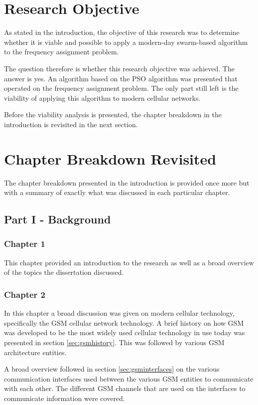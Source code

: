 \section{Research Objective}
As stated in the introduction, the objective of this research was to determine whether it is viable and possible to apply a modern-day swarm-based algorithm to the frequency assignment problem. 

The question therefore is whether this research objective was achieved. The answer is yes. An algorithm based on the PSO algorithm was presented that operated on the frequency assignment problem. The only part still left is the viability of applying this algorithm to modern cellular networks.

Before the viability analysis is presented, the chapter breakdown in the introduction is revisited in the next section.

\section{Chapter Breakdown Revisited}
The chapter breakdown presented in the introduction is provided once more but with a summary of exactly what was discussed in each particular chapter.
\subsection{Part I - Background}
\subsubsection{Chapter 1}
This chapter provided an introduction to the research as well as a broad overview of the topics the dissertation discussed. 
\subsubsection{Chapter 2}
In this chapter a broad discussion was given on modern cellular technology, specifically the GSM cellular network technology. A brief history on how GSM was developed to be the most widely used cellular technology in use today was presented in section \ref{sec:gsmhistory}. This was followed by various GSM architecture entities.

A broad overview followed in section \ref{sec:gsminterfaces} on the various communication interfaces used between the various GSM entities to communicate with each other. The different GSM channels that are used on the interfaces to communicate information were covered.


